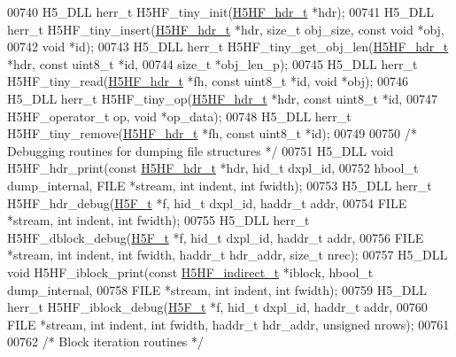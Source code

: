 \begin{DoxyCode}
00740 H5\_DLL herr\_t H5HF\_tiny\_init(\hyperlink{struct_h5_h_f__hdr__t}{H5HF\_hdr\_t} *hdr);
00741 H5\_DLL herr\_t H5HF\_tiny\_insert(\hyperlink{struct_h5_h_f__hdr__t}{H5HF\_hdr\_t} *hdr, \textcolor{keywordtype}{size\_t} obj\_size, \textcolor{keyword}{const} \textcolor{keywordtype}{void} *obj,
00742     \textcolor{keywordtype}{void} *\textcolor{keywordtype}{id});
00743 H5\_DLL herr\_t H5HF\_tiny\_get\_obj\_len(\hyperlink{struct_h5_h_f__hdr__t}{H5HF\_hdr\_t} *hdr, \textcolor{keyword}{const} uint8\_t *\textcolor{keywordtype}{id},
00744     \textcolor{keywordtype}{size\_t} *obj\_len\_p);
00745 H5\_DLL herr\_t H5HF\_tiny\_read(\hyperlink{struct_h5_h_f__hdr__t}{H5HF\_hdr\_t} *fh, \textcolor{keyword}{const} uint8\_t *\textcolor{keywordtype}{id}, \textcolor{keywordtype}{void} *obj);
00746 H5\_DLL herr\_t H5HF\_tiny\_op(\hyperlink{struct_h5_h_f__hdr__t}{H5HF\_hdr\_t} *hdr, \textcolor{keyword}{const} uint8\_t *\textcolor{keywordtype}{id},
00747     H5HF\_operator\_t op, \textcolor{keywordtype}{void} *op\_data);
00748 H5\_DLL herr\_t H5HF\_tiny\_remove(\hyperlink{struct_h5_h_f__hdr__t}{H5HF\_hdr\_t} *fh, \textcolor{keyword}{const} uint8\_t *\textcolor{keywordtype}{id});
00749 
00750 \textcolor{comment}{/* Debugging routines for dumping file structures */}
00751 H5\_DLL \textcolor{keywordtype}{void} H5HF\_hdr\_print(\textcolor{keyword}{const} \hyperlink{struct_h5_h_f__hdr__t}{H5HF\_hdr\_t} *hdr, hid\_t dxpl\_id,
00752     hbool\_t dump\_internal, FILE *stream, \textcolor{keywordtype}{int} indent, \textcolor{keywordtype}{int} fwidth);
00753 H5\_DLL herr\_t H5HF\_hdr\_debug(\hyperlink{struct_h5_f__t}{H5F\_t} *f, hid\_t dxpl\_id, haddr\_t addr,
00754     FILE *stream, \textcolor{keywordtype}{int} indent, \textcolor{keywordtype}{int} fwidth);
00755 H5\_DLL herr\_t H5HF\_dblock\_debug(\hyperlink{struct_h5_f__t}{H5F\_t} *f, hid\_t dxpl\_id, haddr\_t addr,
00756     FILE *stream, \textcolor{keywordtype}{int} indent, \textcolor{keywordtype}{int} fwidth, haddr\_t hdr\_addr, \textcolor{keywordtype}{size\_t} nrec);
00757 H5\_DLL \textcolor{keywordtype}{void} H5HF\_iblock\_print(\textcolor{keyword}{const} \hyperlink{struct_h5_h_f__indirect__t}{H5HF\_indirect\_t} *iblock, hbool\_t dump\_internal,
00758     FILE *stream, \textcolor{keywordtype}{int} indent, \textcolor{keywordtype}{int} fwidth);
00759 H5\_DLL herr\_t H5HF\_iblock\_debug(\hyperlink{struct_h5_f__t}{H5F\_t} *f, hid\_t dxpl\_id, haddr\_t addr,
00760     FILE *stream, \textcolor{keywordtype}{int} indent, \textcolor{keywordtype}{int} fwidth, haddr\_t hdr\_addr, \textcolor{keywordtype}{unsigned} nrows);
00761 
00762 \textcolor{comment}{/* Block iteration routines */}

\end{DoxyCode}
